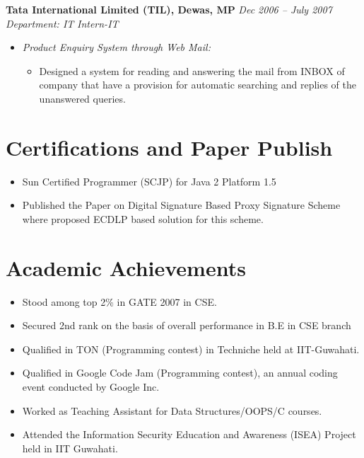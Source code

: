 \documentclass[margin,line]{resume}
\begin{document}
\begin{resume}
    \textbf{Tata International Limited (TIL), Dewas, MP} \hfill \textsl{Dec 2006 -- July 2007}\vspace{0mm}\\\vspace{0mm}%
    \textsl{Department: IT} \hfill \textsl{Intern-IT}
     \begin{itemize}
     \item \textsl{Product Enquiry System through Web Mail:} 
            \begin{itemize}
             \item Designed a system for reading and answering the mail from INBOX of company that have a provision for automatic searching and replies of the unanswered queries.
	      \end{itemize}
     \end{itemize}

    \section{\mysidestyle Certifications and Paper Publish}
     \begin{itemize}
      \item Sun Certified Programmer (SCJP) for Java 2 Platform 1.5
      \item Published the Paper on Digital Signature Based Proxy Signature Scheme where proposed ECDLP based solution for this scheme.
\end{itemize}

     
 \section{\mysidestyle Academic Achievements}
\begin{itemize}
  \item Stood among top 2\% in GATE 2007 in CSE.
   \item Secured 2nd rank on the basis of overall performance in B.E in CSE branch
\item Qualified in TON (Programming contest) in Techniche held at IIT-Guwahati. 
\item Qualified in Google Code Jam (Programming contest), an annual coding event conducted by Google Inc.
\item Worked as Teaching Assistant for Data Structures/OOPS/C courses.
\item Attended the Information Security Education and Awareness (ISEA) Project held in IIT Guwahati.
 \end{itemize}

                                                                                                                                          




\end{resume}
\end{document}
